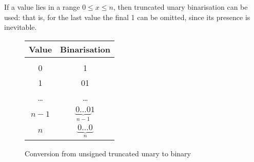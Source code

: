 

If a value lies in a range $0 \leq x \leq n$, then truncated unary
binarisation can be used: that is, for the last value the final 1 can be
omitted, since its presence is inevitable.

\begin{figure}[h]
\begin{tabular}{c|c}
Value & Binarisation \\
\hline\\
0     & 1 \\
1     & 01 \\
\dots & \dots \\
$n-1$ & $\underbrace{0\dots0}_{n-1} 1$ \\
$n$   & $\underbrace{0\dots0}_{n}$
\end{tabular}

\caption{Conversion from unsigned truncated unary to binary}
\end{figure}

